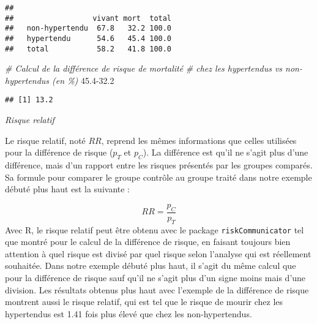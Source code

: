 \documentclass[
]{book}
\newenvironment{Shaded}{\begin{snugshade}}{\end{snugshade}}
\newcommand{\CommentTok}[1]{\textcolor[rgb]{0.56,0.35,0.01}{\textit{#1}}}
\newcommand{\FloatTok}[1]{\textcolor[rgb]{0.00,0.00,0.81}{#1}}
\newcommand{\FunctionTok}[1]{\textcolor[rgb]{0.00,0.00,0.00}{#1}}
\newcommand{\NormalTok}[1]{#1}
\newcommand{\OtherTok}[1]{\textcolor[rgb]{0.56,0.35,0.01}{#1}}
\newcommand{\SpecialCharTok}[1]{\textcolor[rgb]{0.00,0.00,0.00}{#1}}
\newcommand{\StringTok}[1]{\textcolor[rgb]{0.31,0.60,0.02}{#1}}
\begin{document}
\begin{Shaded}
\end{Shaded}

\begin{verbatim}
##                 
##                  vivant mort  total
##   non-hypertendu  67.8   32.2 100.0
##   hypertendu      54.6   45.4 100.0
##   total           58.2   41.8 100.0
\end{verbatim}

\begin{Shaded}
\begin{Highlighting}[]
\CommentTok{\# Calcul de la différence de risque de mortalité }
\CommentTok{\# chez les hypertendus vs non{-}hypertendus (en \%)}
\FloatTok{45.4{-}32.2}
\end{Highlighting}
\end{Shaded}

\begin{verbatim}
## [1] 13.2
\end{verbatim}

\emph{Risque relatif}

Le risque relatif, noté \(RR\), reprend les mêmes informations que celles utilisées pour la différence de risque (\({p_T}\) et \({p_C}\)). La différence est qu'il ne s'agit plus d'une différence, mais d'un rapport entre les risques présentés par les groupes comparés. Sa formule pour comparer le groupe contrôle au groupe traité dans notre exemple débuté plus haut est la suivante :

\[RR = \frac{{p_C}}{{p_T}}\]
Avec R, le risque relatif peut être obtenu avec le package \texttt{riskCommunicator} tel que montré pour le calcul de la différence de risque, en faisant toujours bien attention à quel risque est divisé par quel risque selon l'analyse qui est réellement souhaitée. Dans notre exemple débuté plus haut, il s'agit du même calcul que pour la différence de risque sauf qu'il ne s'agit plus d'un signe moins mais d'une division. Les résultats obtenus plus haut avec l'exemple de la différence de risque montrent aussi le risque relatif, qui est tel que le risque de mourir chez les hypertendus est 1.41 fois plus élevé que chez les non-hypertendus.
\end{document}
